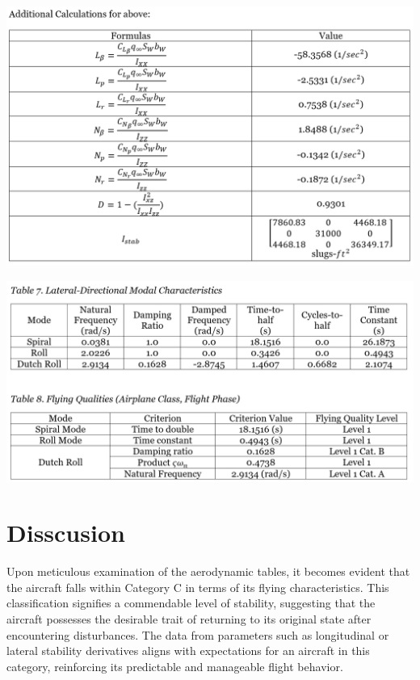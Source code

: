 \documentclass[a4paper, twoside]{article}
\begin{document}
\begin{center}
\includegraphics[width=\linewidth]{table-6-1.png}
\end{center}
\pagebreak
\begin{center}
\includegraphics[width=\linewidth]{table-7-8.png}
\end{center}
\pagebreak
\section{Disscusion}
Upon meticulous examination of the aerodynamic tables, it becomes evident that the aircraft falls within Category C in terms of its flying characteristics. This classification signifies a commendable level of stability, suggesting that the aircraft possesses the desirable trait of returning to its original state after encountering disturbances. The data from parameters such as longitudinal or lateral stability derivatives aligns with expectations for an aircraft in this category, reinforcing its predictable and manageable flight behavior.
\end{document}
